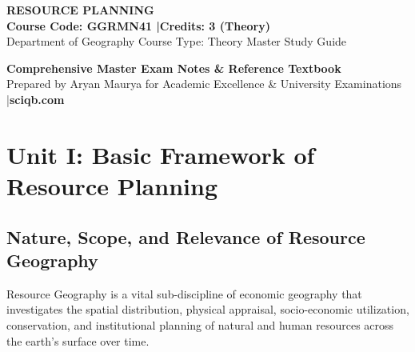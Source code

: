 \documentclass[11pt,a4paper]{article}
\begin{document}
\begin{center}
  \begin{tcolorbox}[width=\textwidth,coltext=white,halign=center]
    \vspace{4pt}
    {\Huge \bfseries RESOURCE PLANNING}\\[6pt]
    {\Large \bfseries Course Code: GGRMN41 \quad|\quad Credits: 3 (Theory)}\\[4pt]
    {\small Department of Geography \quad\textbullet\quad Course Type: Theory \quad\textbullet\quad Master Study Guide}
    \vspace{4pt}
  \end{tcolorbox}
  \vspace{6pt}
  {\Large \bfseries Comprehensive Master Exam Notes \& Reference Textbook}\\[2pt]
  {\small Prepared by Aryan Maurya for Academic Excellence \& University Examinations \quad|\quad \textbf{sciqb.com}}
\end{center}

\vspace{8pt}
\tableofcontents
\newpage

\section{Unit I: Basic Framework of Resource Planning}

\subsection{Nature, Scope, and Relevance of Resource Geography}

\begin{defbox}
Resource Geography is a vital sub-discipline of economic geography that investigates the spatial distribution, physical appraisal, socio-economic utilization, conservation, and institutional planning of natural and human resources across the earth's surface over time.
\end{defbox}
\end{document}

